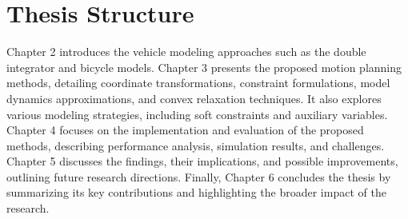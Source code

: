 \section{Thesis Structure} \label{sec:thesis_structure}
Chapter 2 introduces the vehicle modeling approaches such as the double integrator and bicycle models.
Chapter 3 presents the proposed motion planning methods, detailing coordinate transformations, constraint formulations, model dynamics
approximations, and convex relaxation techniques.
It also explores various modeling strategies, including soft constraints and auxiliary variables.
Chapter 4 focuses on the implementation and evaluation of the proposed methods, describing performance analysis, simulation results, and challenges.
Chapter 5 discusses the findings, their implications, and possible improvements, outlining future research directions.
Finally, Chapter 6 concludes the thesis by summarizing its key contributions and highlighting the broader impact of the research.
